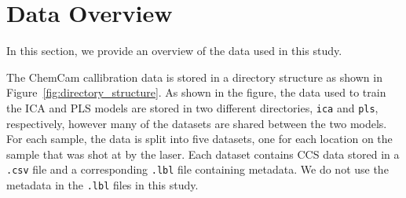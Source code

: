 \section{Data Overview}\label{subsec:data_overview}
In this section, we provide an overview of the data used in this study.

The ChemCam callibration data is stored in a directory structure as shown in Figure~\ref{fig:directory_structure}.
As shown in the figure, the data used to train the ICA and PLS models are stored in two different directories, \texttt{ica} and \texttt{pls}, respectively, however many of the datasets are shared between the two models.
For each sample, the data is split into five datasets, one for each location on the sample that was shot at by the laser.
Each dataset contains CCS data stored in a \texttt{.csv} file and a corresponding \texttt{.lbl} file containing metadata.
We do not use the metadata in the \texttt{.lbl} files in this study.

